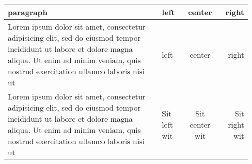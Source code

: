 \documentclass{article}
\begin{document}
\def\test{
  \directlua{
    local lparse = require('lparse')
    local oarg, marg = lparse.scan('O{} v')
    print(oarg, marg)
  }
}


\noindent
\begin{tabular}{p{5cm}|l|c|r}
paragraph & left & center & right \\

\hline

\test{Lorem ipsum dolor sit amet, consectetur adipisicing elit, sed do
eiusmod tempor incididunt ut labore et dolore magna aliqua. Ut enim ad
minim veniam, quis nostrud exercitation ullamco laboris nisi ut}
&
\test{left}
&
\test{center}
&
\test{right}
\\

Lorem ipsum dolor \test{sit amet, consectetur} adipisicing elit, sed do
eiusmod tempor incididunt ut labore et dolore magna aliqua. Ut enim ad
minim veniam, quis nostrud exercitation \test{ullamco laboris nisi ut}
&
Sit \test{left} wit
&
Sit \test{center} wit
&
Sit \test{right} wit
\\
\end{tabular}
\end{document}
